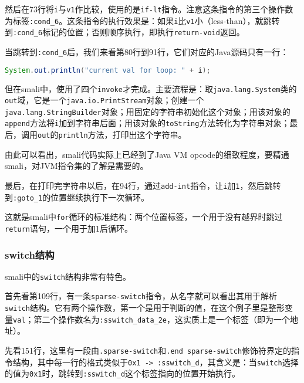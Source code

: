 然后在73行将\lstinline!i!与\lstinline!v1!作比较，使用的是\lstinline!if-lt!指令。注意这条指令的第三个操作数为标签\lstinline!:cond_6!。这条指令的执行效果是：如果\lstinline!i!比\lstinline!v1!小（less-than），就跳转到\lstinline!:cond_6!标记的位置；否则顺序执行，即执行\lstinline!return-void!返回。

当跳转到\lstinline!:cond_6!后，我们来看第80行到91行，它们对应的Java源码只有一行：
\begin{lstlisting}[language=java, numbers=none]
System.out.println("current val for loop: " + i);
\end{lstlisting}
但在smali中，使用了四个\lstinline!invoke!才完成。主要流程是：取\lstinline!java.lang.System!类的\lstinline!out!域，它是一个\lstinline!java.io.PrintStream!对象；创建一个\lstinline!java.lang.StringBuilder!对象；用固定的字符串初始化这个对象；用该对象的\lstinline!append!方法将\lstinline!i!加到字符串后面；用该对象的\lstinline!toString!方法转化为字符串对象；最后，调用\lstinline!out!的\lstinline!println!方法，打印出这个字符串。

由此可以看出，smali代码实际上已经到了Java VM opcode的细致程度，要精通smali，对JVM指令集的了解是需要的。

最后，在打印完字符串以后，在94行，通过\lstinline!add-int!指令，让\lstinline!i!加\lstinline!1!，然后跳转到\lstinline!:goto_1!的位置继续执行下一次循环。

这就是smali中\lstinline!for!循环的标准结构：两个位置标签，一个用于没有越界时跳过\lstinline!return!语句，一个用于加1后循环。

\subsubsection{switch结构}



smali中的\lstinline!switch!结构非常有特色。

首先看第109行，有一条\lstinline!sparse-switch!指令，从名字就可以看出其用于解析\lstinline!switch!结构。它有两个操作数，第一个是用于判断的值，在这个例子里是整形变量\lstinline!val!；第二个操作数名为\lstinline!:sswitch_data_2e!，这实质上是一个标签（即为一个地址）。

先看151行，这里有一段由\lstinline!.sparse-switch!和\lstinline!.end sparse-switch!修饰符界定的指令结构，其中每一行的格式类似于\lstinline!0x1 -> :sswitch_d!，其含义是：当\lstinline!switch!选择的值为\lstinline!0x1!时，跳转到\lstinline!:sswitch_d!这个标签指向的位置开始执行。

